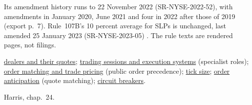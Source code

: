 \begin{qfdefinition}
Its amendment history runs to 22 November 2022 (SR-NYSE-2022-52), with amendments in January 2020, June 2021 and four in 2022 after those of 2019 (export p.~7). Rule~107B's 10 percent average for SLPs is unchanged, last amended 25 January 2023 (SR-NYSE-2023-05) \citep[Rule~107B(a), export pp.~1 and~9]{nyse-rule107b-2026}. The rule texts are rendered pages, not filings.

 \hyperref[def:dealer-quotes-order-flow]{dealers and their quotes}; \hyperref[def:trading-sessions-execution-systems]{trading sessions and execution systems} (specialist roles); \hyperref[mech:order-matching-pricing]{order matching and trade pricing} (public order precedence); \hyperref[def:tick-size]{tick size}; \hyperref[def:order-anticipation]{order anticipation} (quote matching); \hyperref[mech:circuit-breakers-trading-halts]{circuit breakers}.

 Harris, chap.~24.

\end{qfdefinition}

